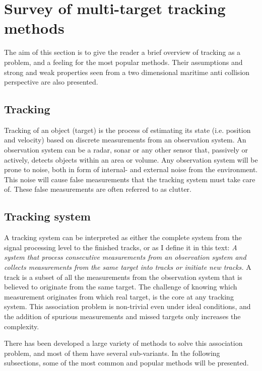 
\section{Survey of multi-target tracking methods}
\label{sec:survey}
The aim of this section is to give the reader a brief overview of tracking as a problem, and a feeling for the most popular methods. Their assumptions and strong and weak properties  seen from a two dimensional maritime anti collision perspective are also presented.

\subsection{Tracking}
Tracking of an object (\gls{target}) is the process of estimating its state (i.e. position and velocity) based on discrete \glspl{measurement} from an observation system. An observation system can be a \gls{radar}, sonar or any other sensor that, passively or actively, detects objects within an area or volume. Any observation system will be prone to noise, both in form of internal- and external noise from the environment. This noise will cause false \glspl{measurement} that the tracking system must take care of. These false \glspl{measurement} are often referred to as \gls{clutter}. 

\subsection{Tracking system}
A tracking system can be interpreted as either the complete system from the signal processing level to the finished tracks, or as I define it in this text: \emph{A system that process consecutive \glspl{measurement} from an observation system and collects \glspl{measurement} from the same \gls{target} into tracks or initiate new tracks.} A track is a subset of all the \glspl{measurement} from the observation system that is believed to originate from the same \gls{target}. The challenge of knowing which \gls{measurement} originates from which real \gls{target}, is the core at any tracking system. This association problem is non-trivial even under ideal conditions, and the addition of spurious \glspl{measurement} and missed \glspl{target} only increases the complexity.

There has been developed a large variety of methods to solve this association problem, and most of them have several sub-variants. In the following subsections, some of the most common and popular methods will be presented.

